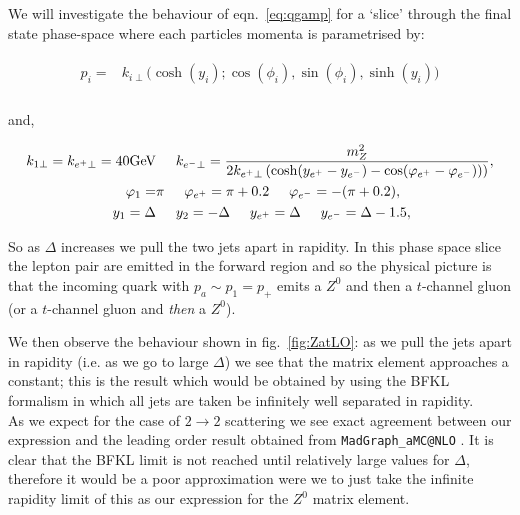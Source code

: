 		We will investigate the behaviour of eqn.~\eqref{eq:qgamp} for a `slice' through the final state phase-space
		where each particles momenta is parametrised by:

		\begin{align*}
		\begin{split}
			p_i = &k_{i\perp}\Big(\cosh (y_i); \cos (\phi_i), \sin (\phi_i), \sinh (y_i)\Big) \\
		\end{split}
		\end{align*}

		and,

		\begin{align}
		\begin{split}
			k_{1\perp} = k_{e^+\perp} = 40\mbox{GeV}& \hspace{0.5cm} k_{e^-\perp} =
			\frac{m_Z^2}{2k_{e^+\perp}\left(\cosh(y_{e^+} - y_{e^-}) -
			    \cos(\varphi_{e^+} - \varphi_{e^-}))\right)}, \\
			\varphi_{1} =& \pi \hspace{0.5cm} \varphi_{e^+} = \pi + 0.2 \hspace{0.5cm}
			\varphi_{e^-} = -(\pi + 0.2), \\
			y_1=\Delta& \hspace{0.5cm} y_2=-\Delta \hspace{0.5cm} y_{e^+} = \Delta
			\hspace{0.5cm} y_{e^-} = \Delta - 1.5,
			\label{eq:momenta}
		\end{split}
		\end{align}

		So as $\Delta$ increases we pull the two jets apart in rapidity.  In this phase space slice
		the lepton pair are emitted in the forward region and so the physical picture is that the
		incoming quark with $p_a\sim p_1=p_+$ emits a $Z^0$ and then a $t$-channel gluon (or a
		$t$-channel gluon and \emph{then} a $Z^0$).

		We then observe the behaviour shown in fig.~\eqref{fig:ZatLO}: as we pull the
		jets apart in rapidity (i.e. as we go to large $\Delta$) we see that the matrix element
		approaches a constant; this is the result which would be obtained by using the BFKL
		formalism in which all jets are taken be infinitely well separated in rapidity.\\As we
		expect for the case of $2\to 2$ scattering we see exact agreement between our expression
		and the leading order result obtained from \texttt{MadGraph\_aMC@NLO} \cite{Alwall:2014hca}.
		It is clear that the BFKL limit is not reached until relatively large values for $\Delta$,
		therefore it would be a poor approximation were we to just take the infinite rapidity limit
		of this as our expression for the $Z^0$ matrix element.

